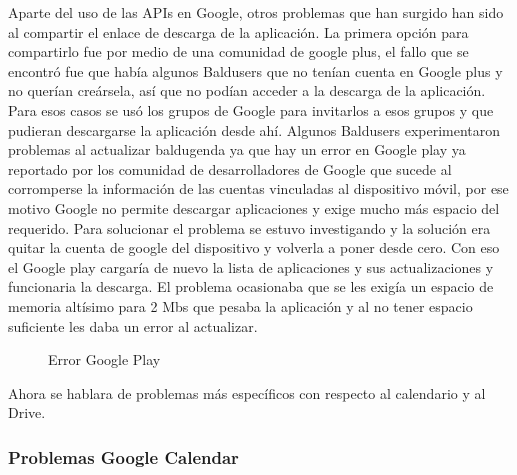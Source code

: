  
Aparte del uso de las APIs en Google, otros problemas que han surgido han sido al compartir el enlace de descarga de la aplicación.
La primera opción para compartirlo fue por medio de una comunidad de google plus,  el fallo que se encontró fue que había algunos Baldusers que no tenían cuenta en Google plus y no querían creársela, así que no podían acceder a la descarga de la aplicación.
Para esos casos se usó los grupos de Google para invitarlos a esos grupos y que pudieran descargarse la aplicación desde ahí.
Algunos Baldusers experimentaron problemas al actualizar baldugenda ya que hay un error en Google play ya reportado por los comunidad de desarrolladores de Google que sucede al corromperse la información de las cuentas vinculadas al dispositivo móvil, por ese motivo Google no permite descargar aplicaciones y exige mucho más espacio del requerido.
Para solucionar el problema se estuvo investigando y la solución era quitar la cuenta de google del dispositivo y volverla a poner desde cero.
Con eso el Google play cargaría de nuevo la lista de aplicaciones y sus actualizaciones y funcionaria la descarga.
El problema ocasionaba que se les exigía un espacio de memoria altísimo para 2 Mbs que pesaba la aplicación y al no tener espacio suficiente les daba un error al actualizar.


\begin{figure}[H] 
  \begin{center} 
    \caption{Error Google Play} 
    \label{fig:ErrorGoogle} 
  \end{center} 
\end{figure}

Ahora se hablara de problemas más específicos con respecto al calendario y al Drive.

\subsubsection{Problemas Google Calendar}
\label{subsubsecc:Problemas Google Calendar}

